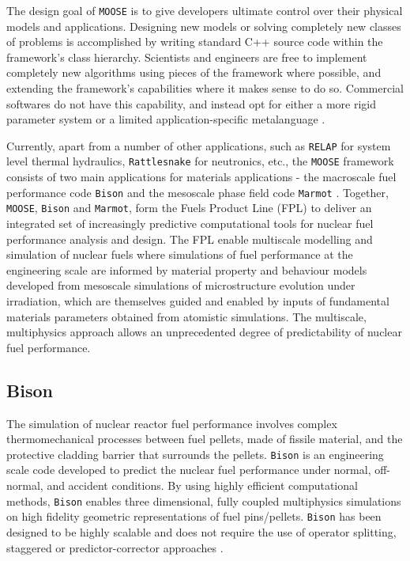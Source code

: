 	The design goal of \texttt{MOOSE} is to give developers ultimate control over their physical models and applications. Designing new models or solving completely new classes of problems is accomplished by writing standard C++ source code within the framework's class hierarchy. Scientists and engineers are free to implement completely new algorithms using pieces of the framework where possible, and extending the framework's capabilities where it makes sense to do so. Commercial softwares do not have this capability, and instead opt for either a more rigid parameter system or a limited application-specific metalanguage \cite{moose-web-page}.
	
	Currently, apart from a number of other applications, such as \texttt{RELAP} \cite{Zhang:aa} for system level thermal hydraulics, \texttt{Rattlesnake} \cite{Wang:aa} for neutronics, etc., the \texttt{MOOSE} framework consists of two main applications for materials applications - the macroscale fuel performance code \texttt{Bison} \cite{Newman09} and the mesoscale phase field code \texttt{Marmot}  \cite{Tonks12}. Together, \texttt{MOOSE}, \texttt{Bison}  and \texttt{Marmot}, form the Fuels Product Line (FPL) to deliver an integrated set of increasingly predictive computational tools for nuclear fuel performance analysis and design. The FPL enable multiscale modelling and simulation of nuclear fuels where simulations of fuel performance at the engineering scale are informed by material property and behaviour models developed from mesoscale simulations of microstructure evolution under irradiation, which are themselves guided and enabled by inputs of fundamental materials parameters obtained from atomistic simulations. The multiscale, multiphysics approach allows an unprecedented degree of predictability of nuclear fuel performance.
	
	\subsection{Bison}
	The simulation of nuclear reactor fuel performance involves complex thermomechanical processes between fuel pellets, made of fissile material, and the protective cladding barrier that surrounds the pellets. \texttt{Bison} is an engineering scale code developed to predict the nuclear fuel performance under normal, off-normal, and accident conditions. By using highly efficient computational methods, \texttt{Bison} enables three dimensional, fully coupled multiphysics simulations on high fidelity geometric representations of fuel pins/pellets. \texttt{Bison} has been designed to be highly scalable and does not require the use of operator splitting, staggered or predictor-corrector approaches \cite{WILLIAMSON2012149}. 
	
